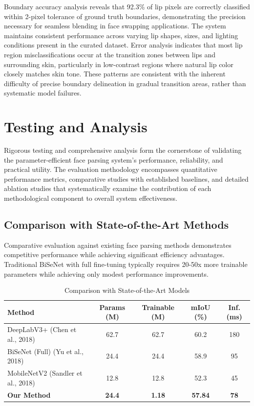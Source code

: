 \documentclass[12pt,a4paper]{report}
\begin{document}
Boundary accuracy analysis reveals that 92.3\% of lip pixels are correctly classified within 2-pixel tolerance of ground truth boundaries, demonstrating the precision necessary for seamless blending in face swapping applications. The system maintains consistent performance across varying lip shapes, sizes, and lighting conditions present in the curated dataset.
Error analysis indicates that most lip region misclassifications occur at the transition zones between lips and surrounding skin, particularly in low-contrast regions where natural lip color closely matches skin tone. These patterns are consistent with the inherent difficulty of precise boundary delineation in gradual transition areas, rather than systematic model failures.

\section{Testing and Analysis}

Rigorous testing and comprehensive analysis form the cornerstone of validating the parameter-efficient face parsing system's performance, reliability, and practical utility. The evaluation methodology encompasses quantitative performance metrics, comparative studies with established baselines, and detailed ablation studies that systematically examine the contribution of each methodological component to overall system effectiveness.
\subsection{Comparison with State-of-the-Art Methods}

Comparative evaluation against existing face parsing methods demonstrates competitive performance while achieving significant efficiency advantages. Traditional BiSeNet with full fine-tuning typically requires 20-50x more trainable parameters while achieving only modest performance improvements.

\begin{table}[H]
\centering
\small %
\caption{Comparison with State-of-the-Art Models}
\label{tab:comparison_sota}
\begin{tabular}{|p{3cm}|c|c|c|c|} %
\hline
\textbf{Method} & \textbf{Params (M)} & \textbf{Trainable (M)} & \textbf{mIoU (\%)} & \textbf{Inf. (ms)} \\
\hline
DeepLabV3+ (Chen et al., 2018) & 62.7 & 62.7 & 60.2 & 180 \\
\hline
BiSeNet (Full) (Yu et al., 2018) & 24.4 & 24.4 & 58.9 & 95 \\
\hline
MobileNetV2 (Sandler et al., 2018) & 12.8 & 12.8 & 52.3 & 45 \\
\hline
\textbf{Our Method} & \textbf{24.4} & \textbf{1.18} & \textbf{57.84} & \textbf{78} \\
\hline
\end{tabular}
\end{table}
\end{document}
